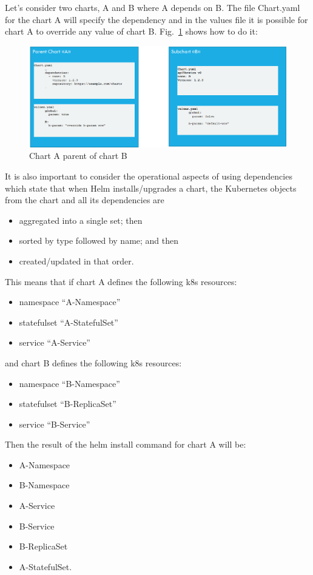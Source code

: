 \documentclass[a4paper]{spie}  %
\begin{document}
Let’s consider two charts, A and B where A depends on B. The file Chart.yaml for the chart A will specify the dependency and in the values file it is possible for chart A to override any value of chart B. Fig.~\ref{fig:a_parent_b} shows how to do it:

\begin{figure}[!htb]
   \centering
   \includegraphics*[width=0.8\columnwidth]{A_parent_B}
   \caption{Chart A parent of chart B}
   \label{fig:a_parent_b}
\end{figure}

It is also important to consider the operational aspects of using dependencies which state that when Helm installs/upgrades a chart, the Kubernetes objects from the chart and all its dependencies are
\begin{itemize}
    \item aggregated into a single set; then
    \item sorted by type followed by name; and then
    \item created/updated in that order.
\end{itemize}
This means that if chart A defines the following k8s resources:
\begin{itemize}
    \item namespace “A-Namespace”
    \item statefulset “A-StatefulSet”
    \item service “A-Service”
\end{itemize}
and chart B defines the following k8s resources:
\begin{itemize}
    \item namespace “B-Namespace”
    \item statefulset “B-ReplicaSet”
    \item service “B-Service”
\end{itemize}
Then the result of the helm install command for chart A will be:
\begin{itemize}
    \item A-Namespace
    \item B-Namespace
    \item A-Service
    \item B-Service
    \item B-ReplicaSet
    \item A-StatefulSet.
\end{itemize}
\end{document}
